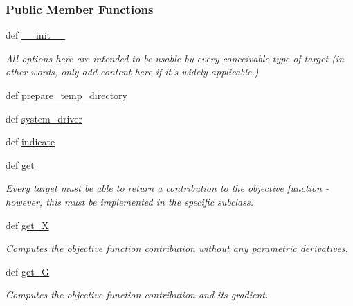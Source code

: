 \subsubsection*{\-Public \-Member \-Functions}
\begin{DoxyCompactItemize}
\item 
def \hyperlink{classforcebalance_1_1tinkerio_1_1BindingEnergy__TINKER_aa7a420d09d5b0370fa8c8bdd713e1adf}{\-\_\-\-\_\-init\-\_\-\-\_\-}
\begin{DoxyCompactList}\small\item\em \-All options here are intended to be usable by every conceivable type of target (in other words, only add content here if it's widely applicable.) \end{DoxyCompactList}\item 
def \hyperlink{classforcebalance_1_1tinkerio_1_1BindingEnergy__TINKER_a88b6b57fdddb3c8f79e8d0ae48b71e88}{prepare\-\_\-temp\-\_\-directory}
\item 
def \hyperlink{classforcebalance_1_1tinkerio_1_1BindingEnergy__TINKER_a615e696facc0170924921bc8cdd4525e}{system\-\_\-driver}
\item 
def \hyperlink{classforcebalance_1_1binding_1_1BindingEnergy_a12deb881863b64276bf847a949a36845}{indicate}
\item 
def \hyperlink{classforcebalance_1_1binding_1_1BindingEnergy_a263fadef13141ef341a01d1f538f85af}{get}
\begin{DoxyCompactList}\small\item\em \-Every target must be able to return a contribution to the objective function -\/ however, this must be implemented in the specific subclass. \end{DoxyCompactList}\item 
def \hyperlink{classforcebalance_1_1target_1_1Target_a606dd136f195c267c05a2455405e5949}{get\-\_\-\-X}
\begin{DoxyCompactList}\small\item\em \-Computes the objective function contribution without any parametric derivatives. \end{DoxyCompactList}\item 
def \hyperlink{classforcebalance_1_1target_1_1Target_afa8cc38c8bba8861c072e789717aa049}{get\-\_\-\-G}
\begin{DoxyCompactList}\small\item\em \-Computes the objective function contribution and its gradient. \end{DoxyCompactList}\item 

\end{DoxyCompactItemize}
